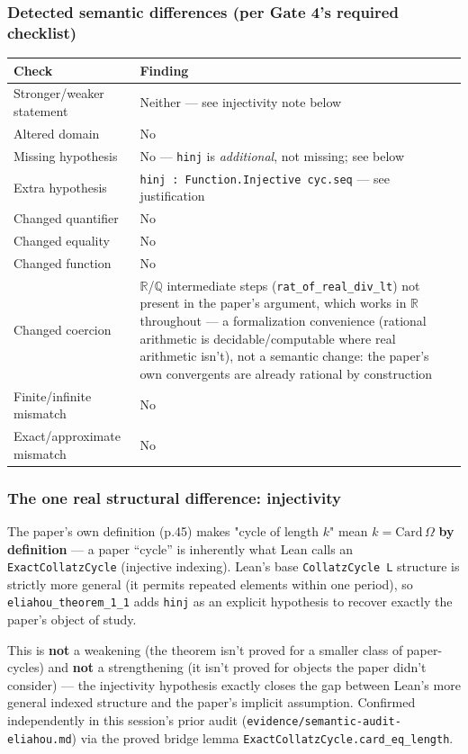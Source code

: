 \documentclass[11pt]{article}
\begin{document}
\subsubsection*{Detected semantic differences (per Gate 4's required checklist)}
\begin{center}\small\begin{tabular}{p{}p{}}\toprule
Check & Finding \\ \midrule
Stronger/weaker statement & Neither --- see injectivity note below \\
Altered domain & No \\
Missing hypothesis & No --- \texttt{hinj} is \emph{additional}, not missing; see below \\
Extra hypothesis & \texttt{hinj : Function.Injective cyc.seq} --- see justification \\
Changed quantifier & No \\
Changed equality & No \\
Changed function & No \\
Changed coercion & \texttt{\ensuremath{\mathbb{R}}}/\texttt{\ensuremath{\mathbb{Q}}} intermediate steps (\texttt{rat\_of\_real\_div\_lt}) not present in the paper's argument, which works in $\mathbb{R}$ throughout --- a formalization convenience (rational arithmetic is decidable/computable where real arithmetic isn't), not a semantic change: the paper's own convergents are already rational by construction \\
Finite/infinite mismatch & No \\
Exact/approximate mismatch & No \\
\bottomrule\end{tabular}\end{center}
\subsubsection*{The one real structural difference: injectivity}
The paper's own definition (p.45) makes "cycle of length $k$" mean $k=\mathrm{Card}\,\Omega$ \textbf{by definition} --- a paper ``cycle'' is inherently what Lean calls an \texttt{ExactCollatzCycle} (injective indexing). Lean's base \texttt{CollatzCycle L} structure is strictly more general (it permits repeated elements within one period), so \texttt{eliahou\_theorem\_1\_1} adds \texttt{hinj} as an explicit hypothesis to recover exactly the paper's object of study.

This is \textbf{not} a weakening (the theorem isn't proved for a smaller class of paper-cycles) and \textbf{not} a strengthening (it isn't proved for objects the paper didn't consider) --- the injectivity hypothesis exactly closes the gap between Lean's more general indexed structure and the paper's implicit assumption. Confirmed independently in this session's prior audit (\texttt{evidence/semantic-audit-eliahou.md}) via the proved bridge lemma \texttt{ExactCollatzCycle.card\_eq\_length}.
\end{document}
